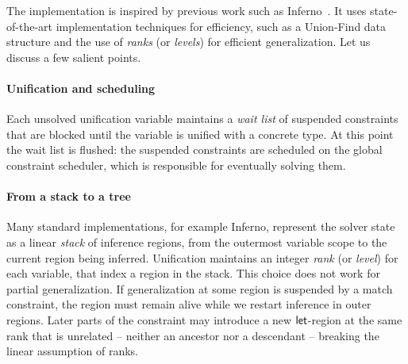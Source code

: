 \documentclass[acmsmall,screen,nonacm,review]{acmart}
\begin{document}
The implementation is inspired by previous work such as
Inferno~\citet*{inferno}. It uses state-of-the-art implementation
techniques for efficiency, such as a Union-Find data structure and the
use of \emph{ranks} (or \emph{levels}) for efficient
generalization. Let us discuss a few salient points.

\paragraph{Unification and scheduling} Each unsolved unification
variable maintains a \emph{wait list} of suspended constraints that
are blocked until the variable is unified with a concrete type. At
this point the wait list is flushed: the suspended constraints are
scheduled on the global constraint scheduler, which is responsible for
eventually solving them.

\paragraph{From a stack to a tree}


Many standard \ML implementations, for example Inferno, represent the
solver state as a linear \emph{stack} of inference regions, from the
outermost variable scope to the current region being inferred. Unification maintains an integer \emph{rank} (or \emph{level}) for each variable, that index a region in the stack.
%
This choice does not work for partial generalization. If
generalization at some region is suspended by a match constraint, the
region must remain alive while we restart inference in outer
regions. Later parts of the constraint may introduce a new
$\mathopen{}\mathrel{\mathsf{let}}$-region at the same rank that is unrelated -- neither an
ancestor nor a descendant -- breaking the linear assumption of ranks.
\end{document}
